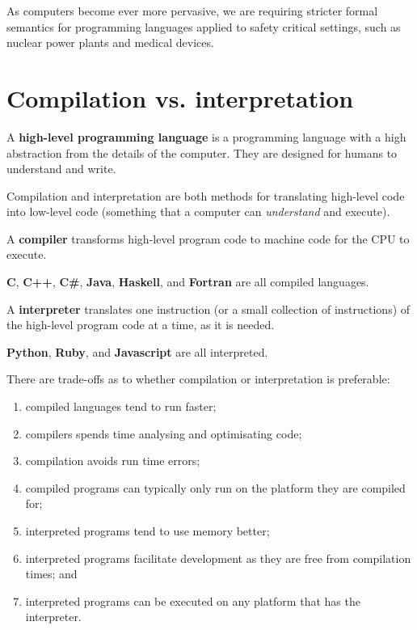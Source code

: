 As computers become ever more pervasive, we are requiring stricter formal semantics for programming languages applied to safety critical settings, such as nuclear power plants and medical devices.

\section{Compilation vs. interpretation}

\begin{definition}
    A \textbf{high-level programming language} is a programming language with a high abstraction from the details of the computer. They are designed for humans to understand and write. 
\end{definition}

Compilation and interpretation are both methods for translating high-level code into low-level code (something that a computer can \emph{understand} and execute).

\begin{definition}[Compiler]
    A \textbf{compiler} transforms high-level program code to machine code for the CPU to execute.
\end{definition}

\begin{example}
    \textbf{C}, \textbf{C++}, \textbf{C\#}, \textbf{Java}, \textbf{Haskell}, and \textbf{Fortran} are all compiled languages.
\end{example}

\begin{definition}[Interpreter]
    A \textbf{interpreter} translates one instruction (or a small collection of instructions) of the high-level program code at a time, as it is needed.
\end{definition}

\begin{example}
    \textbf{Python}, \textbf{Ruby}, and \textbf{Javascript} are all interpreted.
\end{example}

There are trade-offs as to whether compilation or interpretation is preferable:

\begin{enumerate}
    \item compiled languages tend to run faster;
    \item compilers spends time analysing and optimisating code;
    \item compilation avoids run time errors;
    \item compiled programs can typically only run on the platform they are compiled for;
    \item interpreted programs tend to use memory better;
    \item interpreted programs facilitate development as they are free from compilation times; and
    \item interpreted programs can be executed on any platform that has the interpreter.
\end{enumerate}

